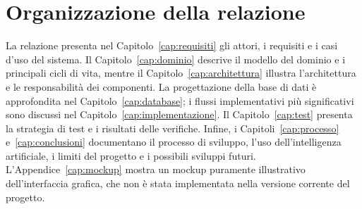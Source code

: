 \section{Organizzazione della relazione}
La relazione presenta nel Capitolo~\ref{cap:requisiti} gli attori,
i requisiti e i casi d'uso del sistema.
Il Capitolo~\ref{cap:dominio} descrive il modello del dominio
e i principali cicli di vita, mentre il
Capitolo~\ref{cap:architettura} illustra l'architettura
e le responsabilità dei componenti.
La progettazione della base di dati è approfondita nel
Capitolo~\ref{cap:database}; i flussi implementativi più significativi
sono discussi nel Capitolo~\ref{cap:implementazione}.
Il Capitolo~\ref{cap:test} presenta la strategia di test
e i risultati delle verifiche.
Infine, i Capitoli~\ref{cap:processo} e~\ref{cap:conclusioni}
documentano il processo di sviluppo, l'uso dell'intelligenza artificiale,
i limiti del progetto e i possibili sviluppi futuri.
L'Appendice~\ref{cap:mockup} mostra un mockup puramente illustrativo dell'interfaccia grafica, che non è stata implementata nella versione corrente del progetto.
